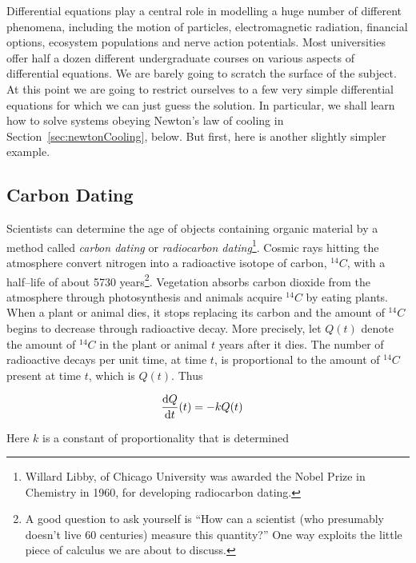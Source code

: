 Differential equations play a central role in modelling a huge number of
different phenomena, including the motion of particles, electromagnetic
radiation, financial options, ecosystem populations and nerve action potentials.
Most universities offer half a dozen different undergraduate courses on various
aspects of differential equations. We are barely going to scratch the surface
of the subject. At this point we are going to restrict ourselves
to a few very simple differential equations for which we can just
guess the solution. In particular, we shall learn how to
solve systems obeying Newton's law of cooling in Section~\ref{sec:newtonCooling},
below. But first, here is another slightly simpler example.




\subsection{Carbon Dating}\label{ssec carbon}
Scientists can determine the age of objects containing organic material by a
method called {\it carbon dating} or {\it radiocarbon dating}\footnote{Willard
Libby, of Chicago University was awarded the Nobel Prize in Chemistry in 1960,
for developing radiocarbon dating.}. Cosmic rays hitting the atmosphere convert
nitrogen into a radioactive isotope of carbon, ${}^{14}C$, with a half--life of
about 5730 years\footnote{A good question to ask yourself is ``How can a
scientist (who presumably doesn't live 60 centuries) measure this quantity?''
One way exploits the little piece of calculus we are about to discuss.}.
Vegetation absorbs carbon dioxide from the atmosphere through photosynthesis and
animals acquire ${}^{14}C$ by eating plants. When a plant or animal dies, it
stops replacing its carbon and the amount of ${}^{14}C$ begins to decrease
through radioactive decay. More precisely, let $Q(t)$ denote the amount of
${}^{14}C$ in the plant or animal $t$ years after it dies. The number of
radioactive decays per unit time, at time $t$, is proportional to the amount of
${}^{14}C$ present at time $t$, which is $Q(t)$. Thus
\begin{impeqn}\label{eq:carbonDating}
\begin{align*}
\diff{Q}{t}(t) &=-k Q(t)
\end{align*}
\end{impeqn}
\noindent Here $k$ is a constant of proportionality that is determined
